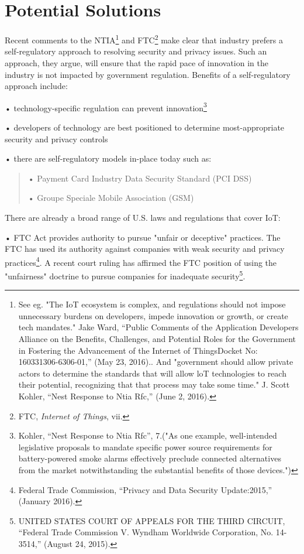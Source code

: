 \section{Potential Solutions}

Recent comments to the NTIA\footnote{See eg. "The IoT ecosystem is
  complex, and regulations should not impose unnecessary burdens on
  developers, impede innovation or growth, or create tech mandates."
  Jake Ward, ``Public Comments of the Application Developers Alliance on
  the Benefits, Challenges, and Potential Roles for the Government in
  Fostering the Advancement of the Internet of ThingsDocket No:
  160331306-6306-01,'' (May 23, 2016).. And "government should allow
  private actors to determine the standards that will allow loT
  technologies to reach their potential, recognizing that that process
  may take some time." J. Scott Kohler, ``Nest Response to Ntia Rfc,''
  (June 2, 2016).} and FTC\footnote{FTC, \emph{Internet of Things}, vii.}
make clear that industry prefers a self-regulatory approach to resolving
security and privacy issues. Such an approach, they argue, will ensure
that the rapid pace of innovation in the industry is not impacted by
government regulation. Benefits of a self-regulatory approach include:

• technology-specific regulation can prevent innovation\footnote{Kohler,
  ``Nest Response to Ntia Rfc'', 7.("As one example, well-intended
  legislative proposals to mandate specific power source requirements
  for battery-powered smoke alarms effectively preclude connected
  alternatives from the market notwithstanding the substantial benefits
  of those devices.")}

• developers of technology are best positioned to determine
most-appropriate security and privacy controls

• there are self-regulatory models in-place today such as:

\begin{quote}
• Payment Card Industry Data Security Standard (PCI DSS)

• Groupe Speciale Mobile Association (GSM)
\end{quote}

There are already a broad range of U.S. laws and regulations that cover
IoT:

• FTC Act provides authority to pursue "unfair or deceptive" practices.
The FTC has used its authority against companies with weak security and
privacy practices\footnote{Federal Trade Commission, ``Privacy and Data
  Security Update:2015,'' (January 2016).}. A recent court ruling has
affirmed the FTC position of using the "unfairness" doctrine to pursue
companies for inadequate security\footnote{UNITED STATES COURT OF
  APPEALS FOR THE THIRD CIRCUIT, ``Federal Trade Commission V. Wyndham
  Worldwide Corporation, No. 14-3514,'' (August 24, 2015).}.

